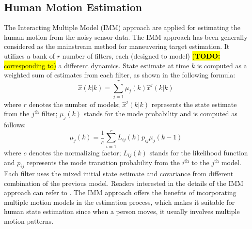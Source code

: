 \documentclass[letterpaper, 10 pt, conference]{ieeeconf}
\newcommand{\todohere}[1]{\hl{(\textbf{TODO:} #1)}}
\begin{document}
	\subsection{Human Motion Estimation}\label{subsec:human_track}
	The Interacting Multiple Model (IMM) approach are applied for estimating the human motion from the noisy sensor data.
	The IMM approach has been generally considered as the mainstream method for maneuvering target estimation. 
	It utilizes a bank of $r$ number of filters, each (designed to model) \todohere{corresponding to} a different dynamics.
	State estimate at time $k$ is computed as a weighted sum of estimates from each filter, as shown in the following formula:
	\[
	\hat{x}(k|k)=\sum\limits_{j=1}^{r}\mu_j(k)\hat{x}^j(k|k)
	\]
	where $r$ denotes the number of models; $\hat{x}^j(k|k)$ represents the state estimate from the $j^\text{th}$ filter; $\mu_j(k)$ stands for the mode probability and is computed as follows:
	\[
	\mu_j(k)=\frac{1}{c}\sum\limits_{i=1}^{r}L_{ij}(k)p_{ij}\mu_j(k-1)
	\]
	where $c$ denotes the normalizing factor; $L_{ij}(k)$ stands for the likelihood function and $p_{ij}$ represents the mode transition probability from the $i^\text{th}$ to the $j^\text{th}$ model. 
	Each filter uses the mixed initial state estimate and covariance from different combination of the previous model. 
	Readers interested in the details of the IMM approach can refer to \cite{yaakov2002estimation}.
	The IMM approach offers the benefits of incorporating multiple motion models in the estimation process, which makes it suitable for human state estimation since when a person moves, it usually involves multiple motion patterns.
	
\end{document}
